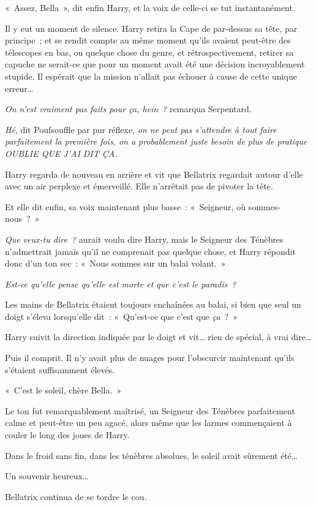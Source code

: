 «~Assez, Bella~», dit enfin Harry, et la voix de celle-ci se tut instantanément.

Il y eut un moment de silence. Harry retira la Cape de par-dessus sa tête, par principe~; et se rendit compte au même moment qu'ils avaient peut-être des télescopes en bas, ou quelque chose du genre, et rétrospectivement, retirer sa capuche ne serait-ce que pour un moment avait été une décision incroyablement stupide. Il espérait que la mission n'allait pas échouer à cause de cette unique erreur…

\emph{On n'est vraiment pas faits pour ça, hein~?} remarqua Serpentard.

\emph{Hé}, dit Poufsouffle par pur réflexe, \emph{on ne peut pas s'attendre à tout faire parfaitement la première fois, on a probablement juste besoin de plus de pratique OUBLIE QUE J'AI DIT ÇA.}

Harry regarda de nouveau en arrière et vit que Bellatrix regardait autour d'elle avec un air perplexe et émerveillé. Elle n'arrêtait pas de pivoter la tête.

Et elle dit enfin, sa voix maintenant plus basse~: «~Seigneur, où sommes-nous~?~»

\emph{Que veux-tu dire~?} aurait voulu dire Harry, mais le Seigneur des Ténèbres n'admettrait jamais qu'il ne comprenait pas quelque chose, et Harry répondit donc d'un ton sec~: «~Nous sommes sur un balai volant.~»

\emph{Est-ce qu'elle pense qu'elle est morte et que c'est le paradis~?}

Les mains de Bellatrix étaient toujours enchaînées au balai, si bien que seul un doigt s'éleva lorsqu'elle dit~: «~Qu'est-ce que c'est que \emph{ça}~?~»

Harry suivit la direction indiquée par le doigt et vit… rien de spécial, à vrai dire…

Puis il comprit. Il n'y avait plus de nuages pour l'obscurcir maintenant qu'ils s'étaient suffisamment élevés.

«~C'est le soleil, chère Bella.~»

Le ton fut remarquablement maîtrisé, un Seigneur des Ténèbres parfaitement calme et peut-être un peu agacé, alors même que les larmes commençaient à couler le long des joues de Harry.

Dans le froid sans fin, dans les ténèbres absolues, le soleil avait sûrement été…

Un souvenir heureux…

Bellatrix continua de se tordre le cou.

